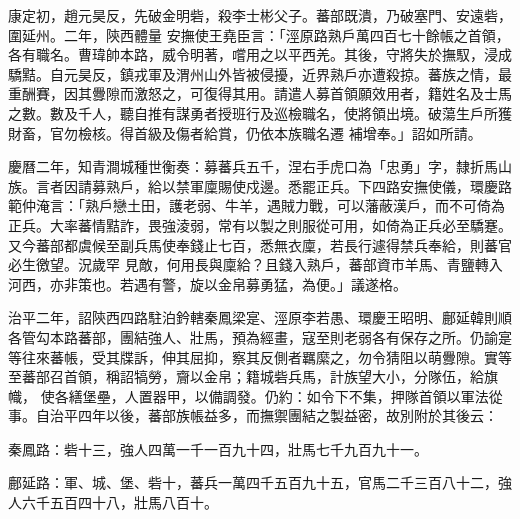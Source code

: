 \begin{pinyinscope}
 康定初，趙元昊反，先破金明砦，殺李士彬父子。蕃部既潰，乃破塞門、安遠砦，圍延州。二年，陝西體量
 安撫使王堯臣言：「涇原路熟戶萬四百七十餘帳之首領，各有職名。曹瑋帥本路，威令明著，嚐用之以平西羌。其後，守將失於撫馭，浸成驕黠。自元昊反，鎮戎軍及渭州山外皆被侵擾，近界熟戶亦遭殺掠。蕃族之情，最重酬賽，因其釁隙而激怒之，可復得其用。請遣人募首領願效用者，籍姓名及士馬之數。數及千人，聽自推有謀勇者授班行及巡檢職名，使將領出境。破蕩生戶所獲財畜，官勿檢核。得首級及傷者給賞，仍依本族職名遷
 補增奉。」詔如所請。



 慶曆二年，知青澗城種世衡奏：募蕃兵五千，涅右手虎口為「忠勇」字，隸折馬山族。言者因請募熟戶，給以禁軍廩賜使戍邊。悉罷正兵。下四路安撫使儀，環慶路範仲淹言：「熟戶戀土田，護老弱、牛羊，遇賊力戰，可以藩蔽漢戶，而不可倚為正兵。大率蕃情黠詐，畏強淩弱，常有以製之則服從可用，如倚為正兵必至驕蹇。又今蕃部都虞候至副兵馬使奉錢止七百，悉無衣廩，若長行遽得禁兵奉給，則蕃官必生徼望。況歲罕
 見敵，何用長與廩給？且錢入熟戶，蕃部資市羊馬、青鹽轉入河西，亦非策也。若遇有警，旋以金帛募勇猛，為便。」議遂格。



 治平二年，詔陝西四路駐泊鈐轄秦鳳梁寔、涇原李若愚、環慶王昭明、鄜延韓則順各管勾本路蕃部，團結強人、壯馬，預為經畫，寇至則老弱各有保存之所。仍諭寔等往來蕃帳，受其牒訴，伸其屈抑，察其反側者羈縻之，勿令猜阻以萌釁隙。實等至蕃部召首領，稱詔犒勞，齎以金帛；籍城砦兵馬，計族望大小，分隊伍，給旗幟，
 使各繕堡壘，人置器甲，以備調發。仍約：如令下不集，押隊首領以軍法從事。自治平四年以後，蕃部族帳益多，而撫禦團結之製益密，故別附於其後云：


秦鳳路：砦十三，強人四萬一千一百九十四，壯馬七千九百九十一。


鄜延路：軍、城、堡、砦十，蕃兵一萬四千五百九十五，官馬二千三百八十二，強人六千五百四十八，壯馬八百十。



\end{pinyinscope}
